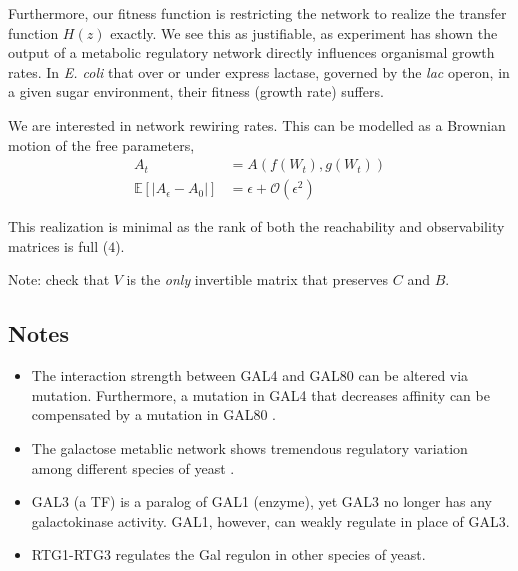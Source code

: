 \documentclass[11 pt]{article}
\begin{document}
    Furthermore, our fitness function is restricting the network to realize the transfer function $H(z)$ exactly. We see this as justifiable, as experiment has shown the output of a metabolic regulatory network directly influences organismal growth rates. In \citet{dekel2005optimality} \emph{E. coli} that over or under express lactase, governed by the \emph{lac} operon, in a given sugar environment, their fitness (growth rate) suffers.

    We are interested in network rewiring rates. This can be modelled as a Brownian motion of the free parameters,
    \begin{align*}
      A_{t} &= A(f(W_{t}), g(W_{t})) \\
      \mathbb{E} [ | A_{\epsilon} - A_{0} | ] &= \epsilon + \mathcal{O}(\epsilon^{2})
    \end{align*}

    This realization is minimal as the rank of both the reachability and observability matrices is full ($4$).

    Note: check that $V$ is the \emph{only} invertible matrix that preserves $C$ and $B$. 
    \subsection{Notes}
    \begin{itemize}
      \item The interaction strength between GAL4 and GAL80 can be altered via mutation. Furthermore, a mutation in GAL4 that decreases affinity can be compensated by a mutation in GAL80 \citep{li2010alterations, salmeron1990gal4, adhikari2014perturbation}.
      \item The galactose metablic network shows tremendous regulatory variation among different species of yeast \citep{lavoie2009rearrangements, martchenko2007transcriptional, dalal2016transcriptional, christensen2011unique, hartl2007induction, alam2013aspergillus}.
      \item GAL3 (a TF) is a paralog of GAL1 (enzyme), yet GAL3 no longer has any galactokinase activity. GAL1, however, can weakly regulate in place of GAL3.
      \item RTG1-RTG3 regulates the Gal regulon in other species of yeast. 
    \end{itemize}
\end{document}
